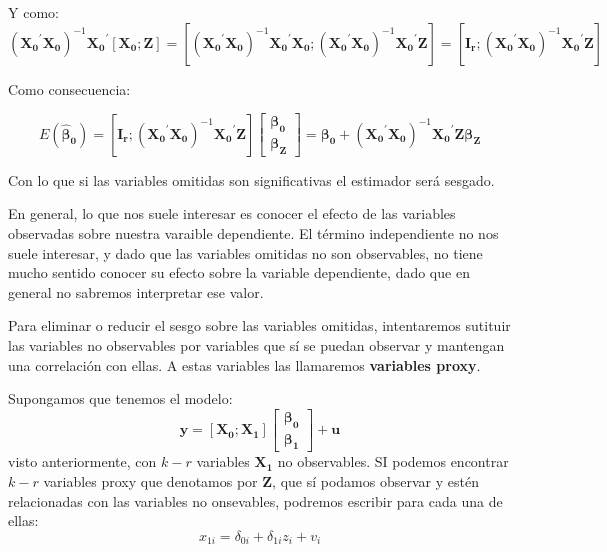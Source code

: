 Y como:
\[\left(\boldsymbol{X_0}^{\prime}\boldsymbol{X_0}\right)^{-1}\boldsymbol{X_0}^{\prime}\left[\boldsymbol{X_0}; \boldsymbol{Z}\right]=\left[\left(\boldsymbol{X_0}^{\prime}\boldsymbol{X_0}\right)^{-1}\boldsymbol{X_0}^{\prime}\boldsymbol{X_0};\left(\boldsymbol{X_0}^{\prime}\boldsymbol{X_0}\right)^{-1}\boldsymbol{X_0}^{\prime}\boldsymbol{Z}\right]=\left[\boldsymbol{I_r};\left(\boldsymbol{X_0}^{\prime}\boldsymbol{X_0}\right)^{-1}\boldsymbol{X_0}^{\prime}\boldsymbol{Z}\right]\]

Como consecuencia:

\[E(\hat{\boldsymbol{\beta}}_{\boldsymbol{0}})=\left[\boldsymbol{I_r};\left(\boldsymbol{X_0}^{\prime}\boldsymbol{X_0}\right)^{-1}\boldsymbol{X_0}^{\prime}\boldsymbol{Z}\right]\left[\begin{matrix}
\boldsymbol{\beta_0} \\
\boldsymbol{\beta_Z}
\end{matrix}\right]=\boldsymbol{\beta_0}+\left(\boldsymbol{X_0}^{\prime}\boldsymbol{X_0}\right)^{-1}\boldsymbol{X_0}^{\prime}\boldsymbol{Z}\boldsymbol{\beta_Z}\]

Con lo que si las variables omitidas son significativas el estimador ser\'a sesgado.

En general, lo que nos suele interesar es conocer el efecto de las variables observadas sobre nuestra varaible dependiente. El t\'ermino independiente no nos suele interesar, y dado que las
variables omitidas no son observables, no tiene mucho sentido conocer su efecto sobre la variable dependiente, dado que en general no sabremos interpretar ese valor.

Para eliminar o reducir el sesgo sobre las variables omitidas, intentaremos sutituir las variables no observables por variables que s\'i se puedan observar y mantengan una correlaci\'on con ellas. A estas variables las llamaremos \textbf{variables proxy}.

Supongamos que tenemos el modelo:
\[\boldsymbol{y}=\left[\boldsymbol{X_0}; \boldsymbol{X_1}\right]\left[\begin{matrix}
\boldsymbol{\beta_0} \\
\boldsymbol{\beta_1}
\end{matrix}\right]+\boldsymbol{u} \]
 visto anteriormente, con $k-r$ variables $\boldsymbol{X_1}$ no observables. SI podemos encontrar $k-r$ variables proxy que denotamos por $\boldsymbol{Z}$, que s\'i podamos observar y est\'en relacionadas con las variables no onsevables, podremos escribir para cada una de ellas:
\[x_{1i}=\delta_{0i}+\delta_{1i}z_i+v_i\]

